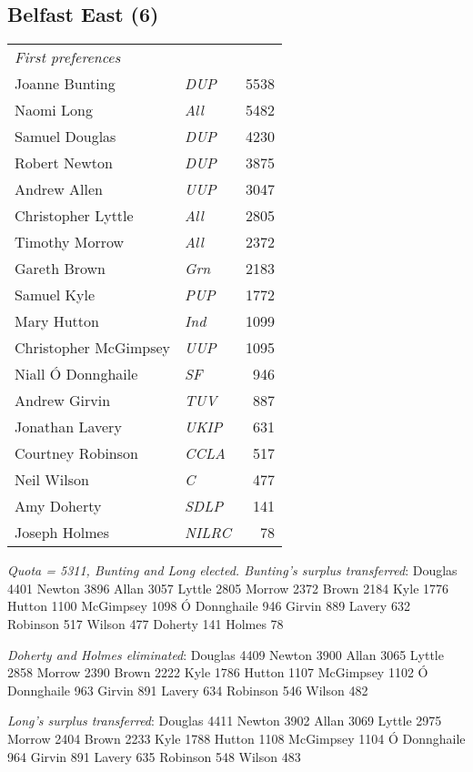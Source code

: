 \begin{resultsiii}

\subsection*{Belfast East (6)}


\noindent
\begin{tabular*}{\columnwidth}{@{\extracolsep{\fill}} p{} >{\itshape}l r @{\extracolsep{\fill}}}
\emph{First preferences}\\
Joanne Bunting & DUP & 5538\\
Naomi Long & All & 5482\\
Samuel Douglas & DUP & 4230\\
Robert Newton & DUP & 3875\\
Andrew Allen & UUP & 3047\\
Christopher Lyttle & All & 2805\\
Timothy Morrow & All & 2372\\
Gareth Brown & Grn & 2183\\
Samuel Kyle & PUP & 1772\\
Mary Hutton & Ind & 1099\\
Christopher McGimpsey & UUP & 1095\\
Niall Ó Donnghaile & SF & 946\\
Andrew Girvin & TUV & 887\\
Jonathan Lavery & UKIP & 631\\
Courtney Robinson & CCLA & 517\\
Neil Wilson & C & 477\\
Amy Doherty & SDLP & 141\\
Joseph Holmes & NILRC & 78\\
\end{tabular*}

\emph{Quota = 5311, Bunting and Long elected.  Bunting's surplus transferred}: Douglas 4401 Newton 3896 Allan 3057 Lyttle 2805 Morrow 2372 Brown 2184 Kyle 1776 Hutton 1100 McGimpsey 1098 Ó Donnghaile 946 Girvin 889 Lavery 632 Robinson 517 Wilson 477 Doherty 141 Holmes 78

\emph{Doherty and Holmes eliminated}: Douglas 4409 Newton 3900 Allan 3065 Lyttle 2858 Morrow 2390 Brown 2222 Kyle 1786 Hutton 1107 McGimpsey 1102 Ó Donnghaile 963 Girvin 891 Lavery 634 Robinson 546 Wilson 482

\emph{Long's surplus transferred}: Douglas 4411 Newton 3902 Allan 3069 Lyttle 2975 Morrow 2404 Brown 2233 Kyle 1788 Hutton 1108 McGimpsey 1104 Ó Donnghaile 964 Girvin 891 Lavery 635 Robinson 548 Wilson 483


\end{resultsiii}
